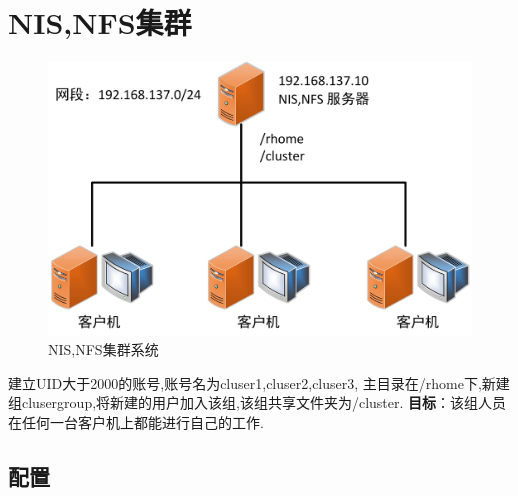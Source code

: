\section{NIS,NFS集群}
\begin{figure}[h]
\centering
\includegraphics[width=\textwidth]{pic/NIS&NFS.jpg}
\caption{NIS,NFS集群系统}
\end{figure}
建立UID大于2000的账号,账号名为cluser1,cluser2,cluser3, 主目录在/rhome下,新建组clusergroup,将新建的用户加入该组,该组共享文件夹为/cluster. \textbf{目标}：该组人员在任何一台客户机上都能进行自己的工作.

\subsection{配置}
